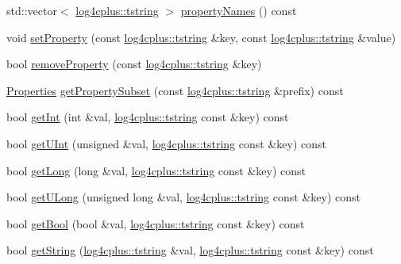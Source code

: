 \begin{DoxyCompactItemize}
\item 
std\-::vector$<$ \hyperlink{namespacelog4cplus_a3c9287f6ebcddc50355e29d71152117b}{log4cplus\-::tstring} $>$ \hyperlink{classlog4cplus_1_1helpers_1_1Properties_a1d21656b6920f86020d495e2d6f59b89}{property\-Names} () const 
\item 
void \hyperlink{classlog4cplus_1_1helpers_1_1Properties_a5771f64994bae41744a0fcad82746477}{set\-Property} (const \hyperlink{namespacelog4cplus_a3c9287f6ebcddc50355e29d71152117b}{log4cplus\-::tstring} \&key, const \hyperlink{namespacelog4cplus_a3c9287f6ebcddc50355e29d71152117b}{log4cplus\-::tstring} \&value)
\item 
bool \hyperlink{classlog4cplus_1_1helpers_1_1Properties_ab775e65a6af449c73e7a54ead00556c4}{remove\-Property} (const \hyperlink{namespacelog4cplus_a3c9287f6ebcddc50355e29d71152117b}{log4cplus\-::tstring} \&key)
\item 
\hyperlink{classlog4cplus_1_1helpers_1_1Properties}{Properties} \hyperlink{classlog4cplus_1_1helpers_1_1Properties_a4de21ebe41cfdbd3d3f7c7846a6a28f6}{get\-Property\-Subset} (const \hyperlink{namespacelog4cplus_a3c9287f6ebcddc50355e29d71152117b}{log4cplus\-::tstring} \&prefix) const 
\item 
bool \hyperlink{classlog4cplus_1_1helpers_1_1Properties_ac99ba2d8e588f9f65468158cd8e52383}{get\-Int} (int \&val, \hyperlink{namespacelog4cplus_a3c9287f6ebcddc50355e29d71152117b}{log4cplus\-::tstring} const \&key) const 
\item 
bool \hyperlink{classlog4cplus_1_1helpers_1_1Properties_ab2a5d2146b7bca3f04016d1f016eda17}{get\-U\-Int} (unsigned \&val, \hyperlink{namespacelog4cplus_a3c9287f6ebcddc50355e29d71152117b}{log4cplus\-::tstring} const \&key) const 
\item 
bool \hyperlink{classlog4cplus_1_1helpers_1_1Properties_a6bca724ba2b39a38a8461eb10c51bde4}{get\-Long} (long \&val, \hyperlink{namespacelog4cplus_a3c9287f6ebcddc50355e29d71152117b}{log4cplus\-::tstring} const \&key) const 
\item 
bool \hyperlink{classlog4cplus_1_1helpers_1_1Properties_a7b120e45f28e1d86e1a2507227cca6c4}{get\-U\-Long} (unsigned long \&val, \hyperlink{namespacelog4cplus_a3c9287f6ebcddc50355e29d71152117b}{log4cplus\-::tstring} const \&key) const 
\item 
bool \hyperlink{classlog4cplus_1_1helpers_1_1Properties_a02e88c61c62a37ed44dab3dda12382f9}{get\-Bool} (bool \&val, \hyperlink{namespacelog4cplus_a3c9287f6ebcddc50355e29d71152117b}{log4cplus\-::tstring} const \&key) const 
\item 
bool \hyperlink{classlog4cplus_1_1helpers_1_1Properties_ac4ba6483e7c15a40cc3b12263ef08fc8}{get\-String} (\hyperlink{namespacelog4cplus_a3c9287f6ebcddc50355e29d71152117b}{log4cplus\-::tstring} \&val, \hyperlink{namespacelog4cplus_a3c9287f6ebcddc50355e29d71152117b}{log4cplus\-::tstring} const \&key) const 
\end{DoxyCompactItemize}
